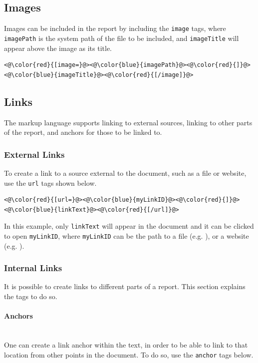 \documentclass{article}
\begin{document}
\subsection{Images}
Images can be included in the report by including the \verb|image| tags, where \verb|imagePath| is the system path of the file to be included, and \verb|imageTitle| will appear above the image as its title.

\begin{lstlisting}
<@\color{red}{[image=}@><@\color{blue}{imagePath}@><@\color{red}{]}@><@\color{blue}{imageTitle}@><@\color{red}{[/image]}@>
\end{lstlisting}

\subsection{Links}
The markup language supports linking to external sources, linking to other parts of the report, and anchors for those to be linked to. 

\subsubsection{External Links}
To create a link to a source external to the document, such as a file or website, use the \verb|url| tags shown below.

\begin{lstlisting}
<@\color{red}{[url=}@><@\color{blue}{myLinkID}@><@\color{red}{]}@><@\color{blue}{linkText}@><@\color{red}{[/url]}@>
\end{lstlisting}

\noindent In this example, only \verb|linkText| will appear in the document and it can be clicked to open \verb|myLinkID|, where \verb|myLinkID| can be the path to a file (e.g. ), or a website (e.g. ).

\subsubsection{Internal Links}
\label{LBL:internalLinks}
It is possible to create links to different parts of a report. This section explains the tags to do so.


\paragraph{Anchors}~\\
One can create a link anchor within the text, in order to be able to link to that location from other points in the document. To do so, use the \verb|anchor| tags below.
\end{document}
